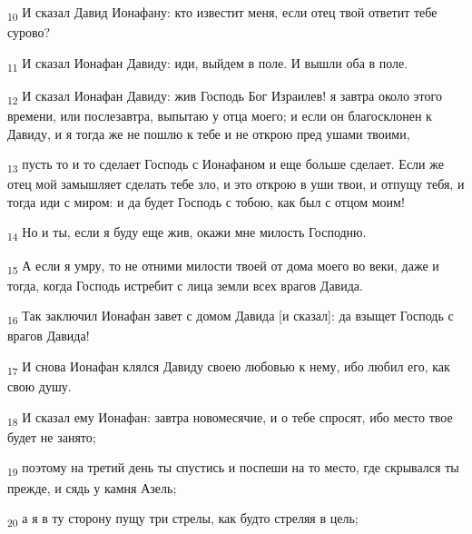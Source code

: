 \begin{tcolorbox}
\textsubscript{10} И сказал Давид Ионафану: кто известит меня, если отец твой ответит тебе сурово?
\end{tcolorbox}
\begin{tcolorbox}
\textsubscript{11} И сказал Ионафан Давиду: иди, выйдем в поле. И вышли оба в поле.
\end{tcolorbox}
\begin{tcolorbox}
\textsubscript{12} И сказал Ионафан Давиду: жив Господь Бог Израилев! я завтра около этого времени, или послезавтра, выпытаю у отца моего; и если он благосклонен к Давиду, и я тогда же не пошлю к тебе и не открою пред ушами твоими,
\end{tcolorbox}
\begin{tcolorbox}
\textsubscript{13} пусть то и то сделает Господь с Ионафаном и еще больше сделает. Если же отец мой замышляет сделать тебе зло, и это открою в уши твои, и отпущу тебя, и тогда иди с миром: и да будет Господь с тобою, как был с отцом моим!
\end{tcolorbox}
\begin{tcolorbox}
\textsubscript{14} Но и ты, если я буду еще жив, окажи мне милость Господню.
\end{tcolorbox}
\begin{tcolorbox}
\textsubscript{15} А если я умру, то не отними милости твоей от дома моего во веки, даже и тогда, когда Господь истребит с лица земли всех врагов Давида.
\end{tcolorbox}
\begin{tcolorbox}
\textsubscript{16} Так заключил Ионафан завет с домом Давида [и сказал]: да взыщет Господь с врагов Давида!
\end{tcolorbox}
\begin{tcolorbox}
\textsubscript{17} И снова Ионафан клялся Давиду своею любовью к нему, ибо любил его, как свою душу.
\end{tcolorbox}
\begin{tcolorbox}
\textsubscript{18} И сказал ему Ионафан: завтра новомесячие, и о тебе спросят, ибо место твое будет не занято;
\end{tcolorbox}
\begin{tcolorbox}
\textsubscript{19} поэтому на третий день ты спустись и поспеши на то место, где скрывался ты прежде, и сядь у камня Азель;
\end{tcolorbox}
\begin{tcolorbox}
\textsubscript{20} а я в ту сторону пущу три стрелы, как будто стреляя в цель;
\end{tcolorbox}
